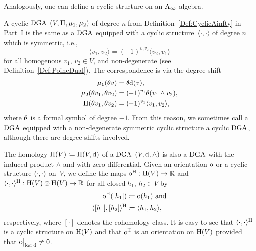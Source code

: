 \documentclass[\MainFolder/Text.tex]{subfiles}
\begin{document}
Analogously, one can define a cyclic structure on an $\mathrm{A}_\infty$-algebra.

\begin{Remark}\label{Rem:Eq}
A cyclic $\mathrm{DGA}$ $(V,\Pi,\mu_1,\mu_2)$ of degree $n$ from Definition~\ref{Def:CyclicAinfty} in Part~I is the same as a $\mathrm{DGA}$ equipped with a cyclic structure~$\langle\cdot,\cdot\rangle$ of degree $n$ which is symmetric, i.e., 
$$ \langle v_1, v_2 \rangle = (-1)^{v_1 v_2} \langle v_2, v_1\rangle $$
for all homogenous $v_1$, $v_2\in V$, and non-degenerate (see Definition~\ref{Def:PoincDual}). The correspondence is via the degree shift
\begin{align*}
\mu_1(\theta v) &= \theta \mathrm{d}(v),\\
\mu_2(\theta v_1, \theta v_2) &= (-1)^{v_1}\theta(v_1\wedge v_2),\\
\Pi(\theta v_1, \theta v_2) & = (-1)^{v_1} \langle v_1,v_2\rangle,
\end{align*}
where $\theta$ is a formal symbol of degree $-1$. From this reason, we sometimes call a $\mathrm{DGA}$ equipped with a non-degenerate symmetric cyclic structure a cyclic $\mathrm{DGA}$, although there are degree shifts involved.
\end{Remark}

The homology $\mathrm{H}(V)\coloneqq \mathrm{H}(V,\mathrm{d})$ of a $\mathrm{DGA}$ $(V,\mathrm{d},\wedge)$ is also a $\mathrm{DGA}$ with the induced product $\wedge$ and with zero differential. Given an orientation $\mathrm{o}$ or a cyclic structure $\langle\cdot,\cdot\rangle$ on~$V$, we define the maps $\mathrm{o}^{\mathrm{H}}: \mathrm{H}(V) \rightarrow \mathbb{R}$ and $\langle\cdot,\cdot\rangle^{\mathrm{H}}: \mathrm{H}(V)\otimes\mathrm{H}(V)\rightarrow\mathbb{R}$ for all closed $h_1$, $h_2\in V$ by
\begin{equation}\label{Eq:IndOnHom}
\begin{aligned}
\mathrm{o}^{\mathrm{H}}([h_1]) &\coloneqq \mathrm{o}(h_1)\text{ and}\\
\langle[h_1],[h_2]\rangle^{\mathrm{H}} &\coloneqq \langle h_1, h_2\rangle,
\end{aligned}
\end{equation}
respectively, where $[\cdot]$ denotes the cohomology class. It is easy to see that $\langle\cdot,\cdot\rangle^{\mathrm{H}}$ is a cyclic structure on $\mathrm{H}(V)$ and that $\mathrm{o}^{\mathrm{H}}$ is an orientation on $\mathrm{H}(V)$ provided that $\Restr{\Or}{\Ker \Dd} \neq 0$. 
\end{document}
